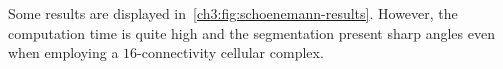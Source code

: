 Some results are displayed in~\cref{ch3:fig:schoenemann-results}. However, the computation time is quite high and the segmentation present sharp angles even when employing a $16$-connectivity cellular complex.

\begin{figure}
\begin{minipage}{0.25\textwidth}
\center
{}


\end{minipage}
\end{figure}
